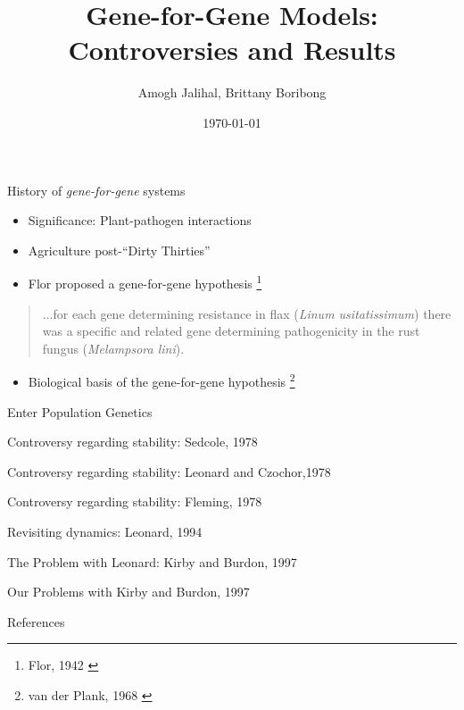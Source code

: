 \documentclass[presentation]{beamer}
\author[Boribong, Jalihal]{Amogh Jalihal, Brittany Boribong}
\date{\today}
\title{Gene-for-Gene Models: Controversies and Results}
\begin{document}
\maketitle
\begin{frame}[label=sec-1]{History of \emph{gene-for-gene} systems}
  \begin{itemize}
  \item Significance: Plant-pathogen interactions
  \item Agriculture post-``Dirty Thirties''
  \item Flor proposed a gene-for-gene hypothesis \footnote{\tiny{Flor, 1942 \cite{flor1942complementary}}}
  \end{itemize}
    \begin{quotation}
      ...for each gene determining resistance in flax (\emph{Linum usitatissimum}) there was a specific and related gene determining pathogenicity in the rust fungus (\emph{Melampsora lini}). 
    \end{quotation}
    \begin{itemize}
    \item Biological basis of the gene-for-gene hypothesis \footnote{\tiny{van der Plank, 1968 \cite{vanderplank1968disease}}}
    \end{itemize}
\end{frame}
\begin{frame}[label=sec-2]{Enter Population Genetics}

\end{frame}
\begin{frame}[label=sec-3]{Controversy regarding stability: Sedcole, 1978}
\end{frame}
\begin{frame}[label=sec-4]{Controversy regarding stability: Leonard and Czochor,1978}
\end{frame}
\begin{frame}[label=sec-5]{Controversy regarding stability: Fleming, 1978}
\end{frame}
\begin{frame}[label=sec-6]{Revisiting dynamics: Leonard, 1994}
\end{frame}
\begin{frame}[label=sec-7]{The Problem with Leonard: Kirby and Burdon, 1997}
\end{frame}
\begin{frame}[label=sec-8]{Our Problems with Kirby and Burdon, 1997}

\end{frame}
\begin{frame}{References}
  

\end{frame}
\end{document}
